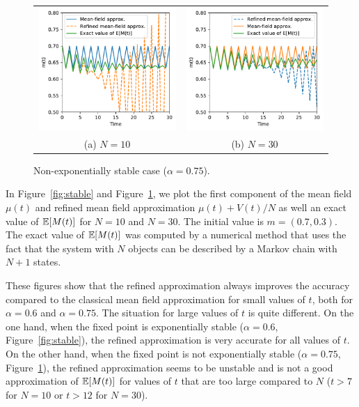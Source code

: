 \documentclass{elsarticle}
\begin{document}
\begin{figure}[ht]
  \centering
  \begin{tabular}{@{}c@{}c@{}}
    \includegraphics[width=.5\linewidth]{unstable1D_a75_N10}
    &\includegraphics[width=.5\linewidth]{unstable1D_a75_N30}\\[-5pt]
    (a) $N=10$ & (b) $N=30$\vspace{-.3cm}
  \end{tabular}
  \caption{Non-exponentially stable case ($\alpha=0.75$). }
  \label{fig:unstable}
\end{figure}

In Figure~\ref{fig:stable} and Figure~\ref{fig:unstable}, we plot the
first component of the mean field $\mu(t)$ and refined mean field
approximation $\mu(t)+V(t)/N$ as well an exact value of $\esp{M(t)}$
for $N=10$ and $N=30$. The initial value is $m=(0.7,0.3)$. The exact
value of $\esp{M(t)}$ was computed by a numerical method that uses the
fact that the system with $N$ objects can be described by a Markov
chain with $N+1$ states.

These figures show that the refined approximation always improves the
accuracy compared to the classical mean field approximation for small
values of $t$, both for $\alpha=0.6$ and $\alpha=0.75$. The situation
for large values of $t$ is quite different. On the one hand, when the
fixed point is exponentially stable ($\alpha=0.6$,
Figure~\ref{fig:stable}), the refined approximation is very accurate
for all values of $t$. On the other hand, when the fixed point is not
exponentially stable ($\alpha=0.75$, Figure~\ref{fig:unstable}), the
refined approximation seems to be unstable and is not a good
approximation of $\esp{M(t)}$ for values of $t$ that are too large
compared to $N$ ($t>7$ for $N=10$ or $t>12$ for $N=30$).
\end{document}
